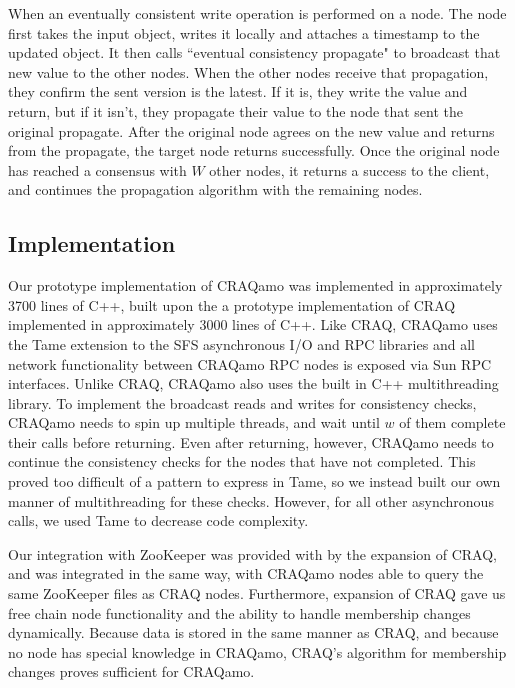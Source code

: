 When an eventually consistent write operation is performed on a node. The node first takes the input object, writes it locally and attaches a timestamp to the updated object. It then calls ``eventual consistency propagate" to broadcast that new value to the other nodes.  When the other nodes receive that propagation, they confirm the sent version is the latest.  If it is, they write the value and return, but if it isn't, they propagate their value to the node that sent the original propagate.  After the original node agrees on the new value and returns from the propagate, the target node returns successfully. Once the original node has reached a consensus with $W$ other nodes, it returns a success to the client, and continues the propagation algorithm with the remaining nodes.


\subsection{Implementation}
Our prototype implementation of CRAQamo was implemented in approximately 3700 lines of C++,
built upon the a prototype implementation of CRAQ implemented in approximately 3000 lines of C++.
Like CRAQ, CRAQamo uses the Tame \cite{tame} extension to the SFS asynchronous I/O and RPC libraries \cite{sfs} and all network functionality between CRAQamo RPC nodes is exposed via Sun RPC interfaces.
Unlike CRAQ, CRAQamo also uses the built in C++ multithreading library.
To implement the broadcast reads and writes for consistency checks, CRAQamo needs to spin up multiple threads, and wait until $w$ of them complete their calls before returning.
Even after returning, however, CRAQamo needs to continue the consistency checks for the nodes that have not completed.
This proved too difficult of a pattern to express in Tame, so we instead built our own manner of multithreading for these checks.
However, for all other asynchronous calls, we used Tame to decrease code complexity.

Our integration with ZooKeeper was provided with by the expansion of CRAQ, and was integrated in the same way, with CRAQamo nodes able to query the same ZooKeeper files as CRAQ nodes.
Furthermore, expansion of CRAQ gave us free chain node functionality and the ability to handle membership changes dynamically.
Because data is stored in the same manner as CRAQ, and because no node has special knowledge in CRAQamo, CRAQ's algorithm for membership changes proves sufficient for CRAQamo.

